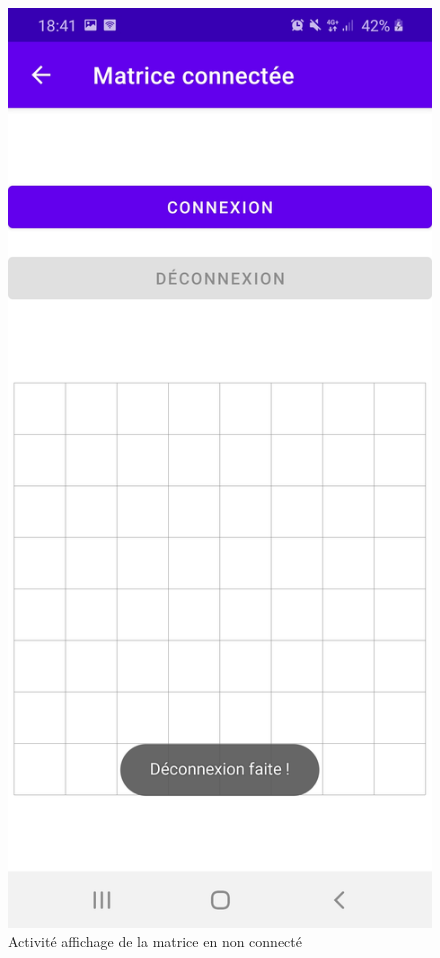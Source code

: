 \documentclass[a4paper,12pt]{report}
\begin{document}
		\begin{figure}[H]
			\centering
				\includegraphics[scale=0.2]{images/matnco.jpg}
				\caption{Activité affichage de la matrice en non connecté}
		\end{figure}
		
\end{document}
